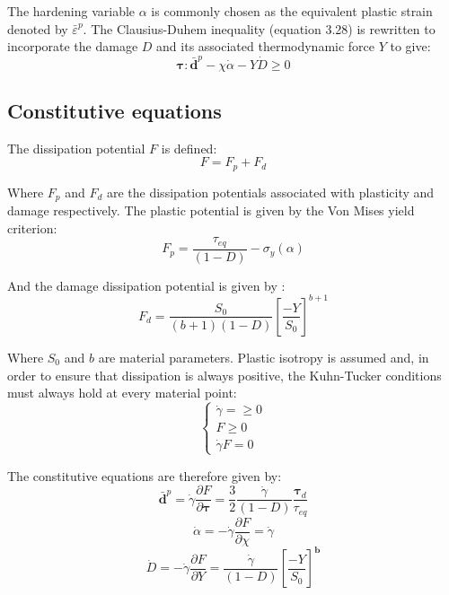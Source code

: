 \documentclass[sn-mathphys,Numbered,draft]{sn-jnl}%
\begin{document}
The hardening variable $\alpha$ is commonly chosen as the equivalent plastic strain denoted by ${\bar{\varepsilon}}^p$. 
The Clausius-Duhem inequality (equation 3.28) is rewritten to incorporate the damage $D$ and its associated thermodynamic force $Y$ to give:
\begin{equation}
\boldsymbol{\tau}:\bar{\mathbf{d}}^p-\chi\dot{\alpha}-Y\dot{D}\geq0
\end{equation}

\subsection{Constitutive equations}

The dissipation potential $F$ is defined:
 \begin{equation}
	F=F_p+F_d	
	\end{equation}

Where $F_p$ and $F_d$ are the dissipation potentials associated with plasticity and damage respectively. The plastic potential is given by the Von Mises yield criterion:
 \begin{equation}
	F_p=\frac{\tau_{eq}}{\left(1-D\right)}-\sigma_y\left(\alpha\right)	
\end{equation}

And the damage dissipation potential is given by \citet{lemaitre_continuous_1985}:
 \begin{equation}
	F_d=\frac{S_0}{\left(b+1\right)\left(1-D\right)}\left[\frac{-Y}{S_0}\right]^{b+1}
\end{equation}

Where $S_0$ and $b$ are material parameters. Plastic isotropy is assumed and, in order to ensure that dissipation is always
positive, the Kuhn-Tucker conditions must always hold at every material point:
\begin{equation}
\left\{\begin{array}{c}
\dot{\gamma}=\geq 0 \\
F\geq 0 \\
\dot{\gamma}F=0
\end{array}\right.
\end{equation}


The constitutive equations are therefore given by:
 \begin{equation}
	\bar{\mathbf{d}}^p=\dot{\gamma}\frac{\partial F}{\partial\boldsymbol{\tau}}=\frac{3}{2}\frac{\dot{\gamma}}{\left(1-D\right)}\frac{\boldsymbol{\tau}_d}{\tau_{eq}}	
\end{equation}
 \begin{equation}
	\dot{\alpha}=-\dot{\gamma}\frac{\partial F}{\partial\chi}=\dot{\gamma}
\end{equation}
 \begin{equation}
	\dot{D}=-\dot{\gamma}\frac{\partial F}{\partial Y}=\frac{\dot{\gamma}}{\left(1-D\right)}\left[\frac{-Y}{S_0}\right]^\mathbf{b}	
\end{equation}
\end{document}

